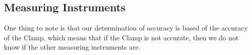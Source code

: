 \subsection{Measuring Instruments}\label{subsec:DISMI}


One thing to note is that our determination of accuracy is based of the accuracy of the Clamp, which means that if the Clamp is not accurate, then we do not know if the other measuring instruments are.